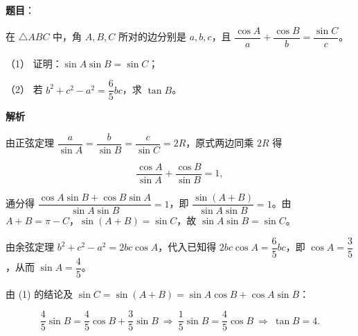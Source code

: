 \begin{answer}

\textbf{题目}：

在 \(\triangle ABC\) 中，角 \(A,B,C\) 所对的边分别是 \(a,b,c\)，且 \(\dfrac{\cos A}{a}+\dfrac{\cos B}{b}=\dfrac{\sin C}{c}\)。

（1） 证明：\(\sin A\sin B=\sin C\)；

（2） 若 \(b^{2}+c^{2}-a^{2}=\dfrac{6}{5}bc\)，求 \(\tan B\)。

\textbf{解析}


由正弦定理 \(\dfrac{a}{\sin A}=\dfrac{b}{\sin B}=\dfrac{c}{\sin C}=2R\)，原式两边同乘 \(2R\) 得

\nopagebreak[4]
\[
\frac{\cos A}{\sin A}+\frac{\cos B}{\sin B}=1,
\]

通分得 \(\dfrac{\cos A\sin B+\cos B\sin A}{\sin A\sin B}=1\)，即 \(\dfrac{\sin(A+B)}{\sin A\sin B}=1\)。由 \(A+B=\pi-C\)，\(\sin(A+B)=\sin C\)，故 \(\sin A\sin B=\sin C\)。


由余弦定理 \(b^{2}+c^{2}-a^{2}=2bc\cos A\)，代入已知得 \(2bc\cos A=\dfrac{6}{5}bc\)，即 \(\cos A=\dfrac{3}{5}\)，从而 \(\sin A=\dfrac{4}{5}\)。

由 (1) 的结论及 \(\sin C=\sin(A+B)=\sin A\cos B+\cos A\sin B\)：

\nopagebreak[4]
\[
\frac{4}{5}\sin B=\frac{4}{5}\cos B+\frac{3}{5}\sin B
\ \Longrightarrow\ \frac{1}{5}\sin B=\frac{4}{5}\cos B
\ \Longrightarrow\ \tan B=4.
\]



\end{answer}
